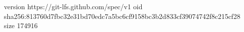 version https://git-lfs.github.com/spec/v1
oid sha256:813760d7fbc32e31bd70edc7a5bc6cf9158bc3b2d833cf39074742f8c215cf28
size 174916
